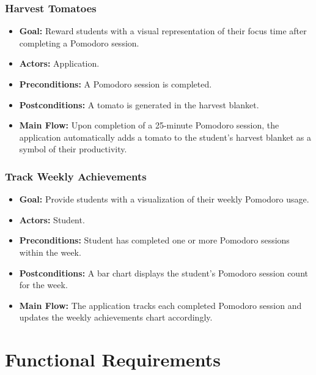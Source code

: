 \documentclass[12pt]{article}
\begin{document}
\subsubsection{Harvest Tomatoes}
\begin{itemize}
    \item \textbf{Goal:} Reward students with a visual representation of their focus time after completing a Pomodoro session.
    \item \textbf{Actors:} Application.
    \item \textbf{Preconditions:} A Pomodoro session is completed.
    \item \textbf{Postconditions:} A tomato is generated in the harvest blanket.
    \item \textbf{Main Flow:} Upon completion of a 25-minute Pomodoro session, the application automatically adds a tomato to the student's harvest blanket as a symbol of their productivity.
\end{itemize}

\subsubsection{Track Weekly Achievements}
\begin{itemize}
    \item \textbf{Goal:} Provide students with a visualization of their weekly Pomodoro usage.
    \item \textbf{Actors:} Student.
    \item \textbf{Preconditions:} Student has completed one or more Pomodoro sessions within the week.
    \item \textbf{Postconditions:} A bar chart displays the student's Pomodoro session count for the week.
    \item \textbf{Main Flow:} The application tracks each completed Pomodoro session and updates the weekly achievements chart accordingly.
\end{itemize}



\section{Functional Requirements}
\end{document}

